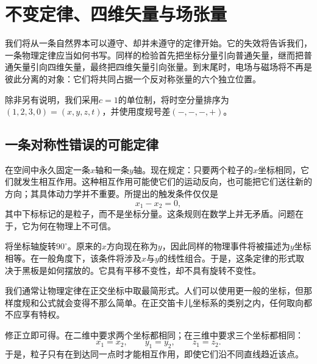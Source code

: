 \chapter{不变定律、四维矢量与场张量}

我们将从一条自然界本可以遵守、却并未遵守的定律开始。它的失效将告诉我们，一条物理定律应当如何书写。同样的检验首先把坐标分量引向普通矢量，继而把普通矢量引向四维矢量，最终把四维矢量引向张量。到末尾时，电场与磁场将不再是彼此分离的对象：它们将共同占据一个反对称张量的六个独立位置。

除非另有说明，我们采用\(c=1\)的单位制，将时空分量排序为\((1,2,3,0)=(x,y,z,t)\)，并使用度规号差\((-,-,-,+)\)。

\section{一条对称性错误的可能定律}

在空间中永久固定一条\(x\)轴和一条\(y\)轴。现在规定：只要两个粒子的\(x\)坐标相同，它们就发生相互作用。这种相互作用可能使它们的运动反向，也可能把它们送往新的方向；其具体动力学并不重要。所提出的触发条件仅仅是
\begin{equation}
  x_1-x_2=0,
\end{equation}
其中下标标记的是粒子，而不是坐标分量。这条规则在数学上并无矛盾。问题在于，它为何在物理上不可信。

\begin{classroomqa}
\end{classroomqa}

将坐标轴旋转\(90^\circ\)。原来的\(x\)方向现在称为\(y\)，因此同样的物理事件将被描述为\(y\)坐标相等。在一般角度下，该条件将涉及\(x\)与\(y\)的线性组合。于是，这条定律的形式取决于黑板是如何摆放的。它具有平移不变性，却不具有旋转不变性。

我们通常让物理定律在正交坐标中取最简形式。人们可以使用更一般的坐标，但那样度规和公式就会变得不那么简单。在正交笛卡儿坐标系的类别之内，任何取向都不应享有特权。

修正立即可得。在二维中要求两个坐标都相同；在三维中要求三个坐标都相同：
\begin{equation}
  x_1=x_2,
  \qquad y_1=y_2,
  \qquad z_1=z_2.
\end{equation}
于是，粒子只有在到达同一点时才能相互作用，即使它们沿不同直线趋近该点。

\begin{classroomqa}
\end{classroomqa}

